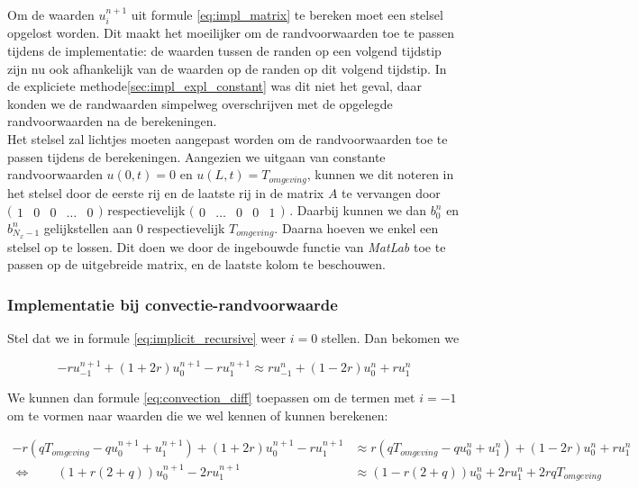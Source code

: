 \documentclass[a4paper,kulak]{kulakarticle} %
\begin{document}
Om de waarden $u_i^{n+1}$ uit formule \ref{eq:impl_matrix} te bereken moet een stelsel opgelost worden. Dit maakt het moeilijker om de randvoorwaarden toe te passen tijdens de implementatie: de waarden tussen de randen op een volgend tijdstip zijn nu ook afhankelijk van de waarden op de randen op dit volgend tijdstip. In de expliciete methode\ref{sec:impl_expl_constant} was dit niet het geval, daar konden we de randwaarden simpelweg overschrijven met de opgelegde randvoorwaarden na de berekeningen. \\
Het stelsel zal lichtjes moeten aangepast worden om de randvoorwaarden toe te passen tijdens de berekeningen. Aangezien we uitgaan van constante randvoorwaarden $u(0, t) = 0$ en $u(L, t) = T_{omgeving}$, kunnen we dit noteren in het stelsel door de eerste rij en de laatste rij in de matrix $A$ te vervangen door
$\big(\begin{smallmatrix}
	1 & 0 & 0 & \dots & 0
\end{smallmatrix}\big)$ 
respectievelijk
$\big(\begin{smallmatrix}
	0 & \dots & 0 & 0 & 1
\end{smallmatrix}\big)$
. Daarbij kunnen we dan $b_0^n$ en $b_{N_x - 1}^n$ gelijkstellen aan $0$ respectievelijk $T_{omgeving}$. Daarna hoeven we enkel een stelsel op te lossen. Dit doen we door de ingebouwde functie  van \textit{MatLab} toe te passen op de uitgebreide matrix, en de laatste kolom te beschouwen.

\subsubsection{Implementatie bij convectie-randvoorwaarde}

Stel dat we in formule \ref{eq:implicit_recursive} weer $i = 0$ stellen. Dan bekomen we

\begin{equation*}
	- r u_{-1}^{n+1}
	+ \left(1 + 2r\right) u_0^{n+1}
	- r u_1^{n+1}
	\approx
	r u_{-1}^n
	+ \left(1 - 2 r\right) u_0^n
	+ r u_1^n
\end{equation*}

We kunnen dan formule \ref{eq:convection_diff} toepassen om de termen met $i = -1$ om te vormen naar waarden die we wel kennen of kunnen berekenen:

\begin{align*}
	- r \left(q T_{omgeving} - q u_0^{n+1} + u_1^{n+1}\right)
	+ \left(1 + 2r\right) u_0^{n+1}
	- r u_1^{n+1}
	&\approx
	r \left(q T_{omgeving} - q u_0^n + u_1^n\right)
	+ \left(1 - 2 r\right) u_0^n
	+ r u_1^n \\
	\Leftrightarrow \qquad
	\left(1 + r (2 + q)\right) u_0^{n+1}
	- 2 r u_1^{n+1}
	&\approx
	\left(1 - r (2 + q)\right) u_0^n
	+ 2 r u_1^n
	+ 2 r q T_{omgeving}
\end{align*}
\end{document}
